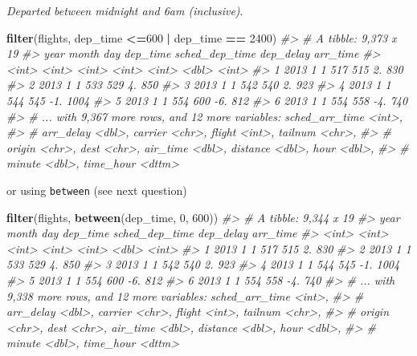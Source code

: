 \documentclass[]{book}
\newenvironment{Shaded}{\begin{snugshade}}{\end{snugshade}}
\newcommand{\CommentTok}[1]{\textcolor[rgb]{0.56,0.35,0.01}{\textit{#1}}}
\newcommand{\DecValTok}[1]{\textcolor[rgb]{0.00,0.00,0.81}{#1}}
\newcommand{\KeywordTok}[1]{\textcolor[rgb]{0.13,0.29,0.53}{\textbf{#1}}}
\newcommand{\NormalTok}[1]{#1}
\newcommand{\OperatorTok}[1]{\textcolor[rgb]{0.81,0.36,0.00}{\textbf{#1}}}
\newcommand{\StringTok}[1]{\textcolor[rgb]{0.31,0.60,0.02}{#1}}
\theoremstyle{definition}
\theoremstyle{definition}
\theoremstyle{definition}
\theoremstyle{remark}
\begin{document}
\emph{Departed between midnight and 6am (inclusive)}.

\begin{Shaded}
\begin{Highlighting}[]
\KeywordTok{filter}\NormalTok{(flights, dep_time }\OperatorTok{<=}\DecValTok{600} \OperatorTok{|}\StringTok{ }\NormalTok{dep_time }\OperatorTok{==}\StringTok{ }\DecValTok{2400}\NormalTok{)}
\CommentTok{#> # A tibble: 9,373 x 19}
\CommentTok{#>    year month   day dep_time sched_dep_time dep_delay arr_time}
\CommentTok{#>   <int> <int> <int>    <int>          <int>     <dbl>    <int>}
\CommentTok{#> 1  2013     1     1      517            515        2.      830}
\CommentTok{#> 2  2013     1     1      533            529        4.      850}
\CommentTok{#> 3  2013     1     1      542            540        2.      923}
\CommentTok{#> 4  2013     1     1      544            545       -1.     1004}
\CommentTok{#> 5  2013     1     1      554            600       -6.      812}
\CommentTok{#> 6  2013     1     1      554            558       -4.      740}
\CommentTok{#> # ... with 9,367 more rows, and 12 more variables: sched_arr_time <int>,}
\CommentTok{#> #   arr_delay <dbl>, carrier <chr>, flight <int>, tailnum <chr>,}
\CommentTok{#> #   origin <chr>, dest <chr>, air_time <dbl>, distance <dbl>, hour <dbl>,}
\CommentTok{#> #   minute <dbl>, time_hour <dttm>}
\end{Highlighting}
\end{Shaded}

or using \texttt{between} (see next question)

\begin{Shaded}
\begin{Highlighting}[]
\KeywordTok{filter}\NormalTok{(flights, }\KeywordTok{between}\NormalTok{(dep_time, }\DecValTok{0}\NormalTok{, }\DecValTok{600}\NormalTok{))}
\CommentTok{#> # A tibble: 9,344 x 19}
\CommentTok{#>    year month   day dep_time sched_dep_time dep_delay arr_time}
\CommentTok{#>   <int> <int> <int>    <int>          <int>     <dbl>    <int>}
\CommentTok{#> 1  2013     1     1      517            515        2.      830}
\CommentTok{#> 2  2013     1     1      533            529        4.      850}
\CommentTok{#> 3  2013     1     1      542            540        2.      923}
\CommentTok{#> 4  2013     1     1      544            545       -1.     1004}
\CommentTok{#> 5  2013     1     1      554            600       -6.      812}
\CommentTok{#> 6  2013     1     1      554            558       -4.      740}
\CommentTok{#> # ... with 9,338 more rows, and 12 more variables: sched_arr_time <int>,}
\CommentTok{#> #   arr_delay <dbl>, carrier <chr>, flight <int>, tailnum <chr>,}
\CommentTok{#> #   origin <chr>, dest <chr>, air_time <dbl>, distance <dbl>, hour <dbl>,}
\CommentTok{#> #   minute <dbl>, time_hour <dttm>}
\end{Highlighting}
\end{Shaded}
\end{document}
